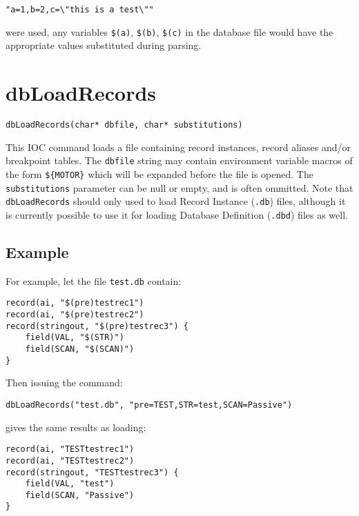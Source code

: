 \begin{verbatim}
"a=1,b=2,c=\"this is a test\""
\end{verbatim}

were used, any variables \verb|$(a)|, \verb|$(b)|, \verb|$(c)| in the database file would have the appropriate values substituted during parsing.

\section{dbLoadRecords}

\begin{verbatim}
dbLoadRecords(char* dbfile, char* substitutions)
\end{verbatim}

This IOC command loads a file containing record instances, record aliases and/or breakpoint tables.
The \verb|dbfile| string may contain environment variable macros of the form \verb|${MOTOR}| which will be expanded before the file is opened.
The \verb|substitutions| parameter can be null or empty, and is often ommitted.
Note that \verb|dbLoadRecords| should only used to load Record Instance (\verb|.db|) files, although it is currently possible to use it for loading Database Definition (\verb|.dbd|) files as well.

\subsection{Example}

For example, let the file \verb|test.db| contain:

\begin{verbatim}
record(ai, "$(pre)testrec1")
record(ai, "$(pre)testrec2")
record(stringout, "$(pre)testrec3") {
    field(VAL, "$(STR)")
    field(SCAN, "$(SCAN)")
}
\end{verbatim}

Then issuing the command:

\begin{verbatim}
dbLoadRecords("test.db", "pre=TEST,STR=test,SCAN=Passive")
\end{verbatim}

gives the same results as loading:

\begin{verbatim}
record(ai, "TESTtestrec1")
record(ai, "TESTtestrec2")
record(stringout, "TESTtestrec3") {
    field(VAL, "test")
    field(SCAN, "Passive")
}
\end{verbatim}


